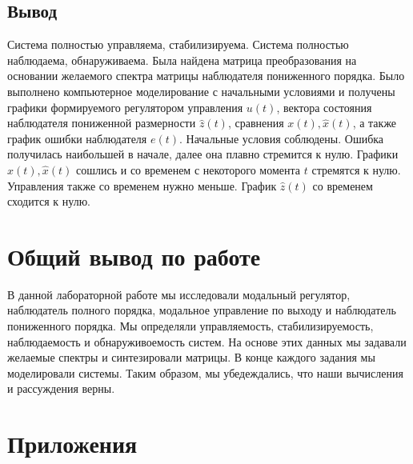\documentclass[a4paper, 12pt]{article}
\begin{document}
    \subsection{Вывод}
    Система полностью управляема, стабилизируема. Система полностью наблюдаема,
    обнаруживаема. Была найдена матрица преобразования на основании желаемого спектра
    матрицы наблюдателя пониженного порядка. Было выполнено компьютерное моделирование
    с начальными условиями и получены графики формируемого регулятором управления $u(t)$,
    вектора состояния наблюдателя пониженной размерности $\hat{z}(t)$, сравнения $x(t),\hat{x}(t)$,
    а также график ошибки наблюдателя $e(t)$. Начальные условия соблюдены. Ошибка получилась наибольшей в начале, далее
    она плавно стремится к нулю. Графики $x(t),\hat{x}(t)$ сошлись и со временем с некоторого
    момента $t$ стремятся к нулю. Управления также со временем нужно меньше.
    График $\hat{z}(t)$ со временем сходится к нулю.
    

    \section{Общий вывод по работе}
    В данной лабораторной работе мы исследовали модальный регулятор,
    наблюдатель полного порядка, модальное управление по выходу и
    наблюдатель пониженного порядка. Мы определяли управляемость,
    стабилизируемость, наблюдаемость и обнаруживоемость систем.
    На основе этих данных мы задавали желаемые спектры и синтезировали матрицы.
    В конце каждого задания мы моделировали системы. Таким образом, мы убедеждались, что наши
    вычисления и рассуждения верны.


    \section{Приложения}
\end{document}
